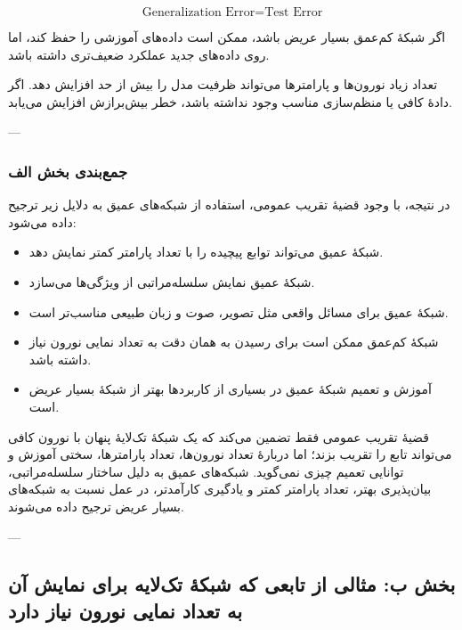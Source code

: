 \documentclass[12pt,a4paper]{article}
\begin{document}
\[
\text{Generalization Error}
=
\text{Test Error}
\]

اگر شبکهٔ کم‌عمق بسیار عریض باشد، ممکن است داده‌های آموزشی را حفظ کند، اما روی داده‌های جدید عملکرد ضعیف‌تری داشته باشد.

\begin{tcolorbox}[
	colback=softpink,
	colframe=softred,
	title=هشدار دربارهٔ شبکهٔ بیش از حد عریض
	]
	تعداد زیاد نورون‌ها و پارامترها می‌تواند ظرفیت مدل را بیش از حد افزایش دهد. اگر دادهٔ کافی یا منظم‌سازی مناسب وجود نداشته باشد، خطر بیش‌برازش افزایش می‌یابد.
\end{tcolorbox}

---

\subsubsection{جمع‌بندی بخش الف}

در نتیجه، با وجود قضیهٔ تقریب عمومی، استفاده از شبکه‌های عمیق به دلایل زیر ترجیح داده می‌شود:

\begin{itemize}
	\item شبکهٔ عمیق می‌تواند توابع پیچیده را با تعداد پارامتر کمتر نمایش دهد.
	\item شبکهٔ عمیق نمایش سلسله‌مراتبی از ویژگی‌ها می‌سازد.
	\item شبکهٔ عمیق برای مسائل واقعی مثل تصویر، صوت و زبان طبیعی مناسب‌تر است.
	\item شبکهٔ کم‌عمق ممکن است برای رسیدن به همان دقت به تعداد نمایی نورون نیاز داشته باشد.
	\item آموزش و تعمیم شبکهٔ عمیق در بسیاری از کاربردها بهتر از شبکهٔ بسیار عریض است.
\end{itemize}

\begin{tcolorbox}[
	colback=softgray,
	colframe=mainblue,
	title=پاسخ نهایی بخش الف
	]
	قضیهٔ تقریب عمومی فقط تضمین می‌کند که یک شبکهٔ تک‌لایهٔ پنهان با نورون کافی می‌تواند تابع را تقریب بزند؛ اما دربارهٔ تعداد نورون‌ها، تعداد پارامترها، سختی آموزش و توانایی تعمیم چیزی نمی‌گوید. شبکه‌های عمیق به دلیل ساختار سلسله‌مراتبی، بیان‌پذیری بهتر، تعداد پارامتر کمتر و یادگیری کارآمدتر، در عمل نسبت به شبکه‌های بسیار عریض ترجیح داده می‌شوند.
\end{tcolorbox}

---

\subsection{بخش ب: مثالی از تابعی که شبکهٔ تک‌لایه برای نمایش آن به تعداد نمایی نورون نیاز دارد}
\end{document}
